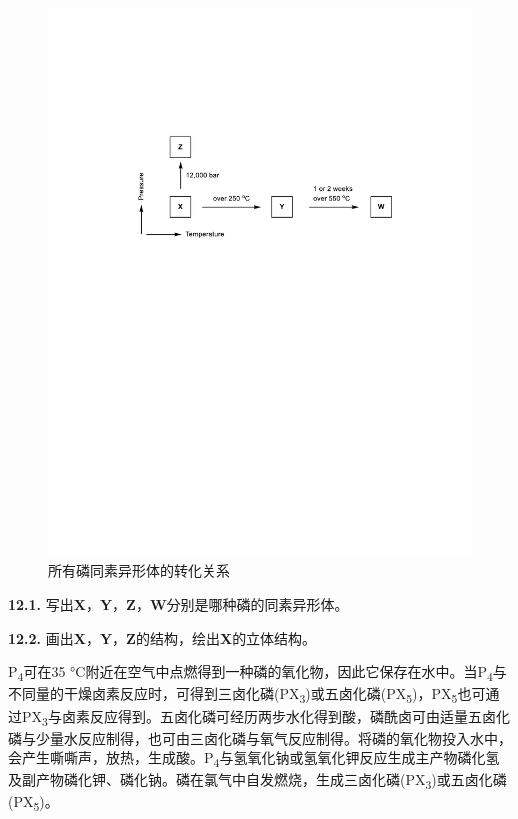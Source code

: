 \begin{figure}[H]
	\centering
	\includegraphics[width=13cm]{./pic/t12-2.pdf}
	\caption*{所有磷同素异形体的转化关系}
\end{figure}

\noindent\textbf{12.1.}
写出\textbf{X}，\textbf{Y}，\textbf{Z}，\textbf{W}分别是哪种磷的同素异形体。

\noindent\textbf{12.2.}
画出\textbf{X}，\textbf{Y}，\textbf{Z}的结构，绘出\textbf{X}的立体结构。

P\textsubscript{4}可在35 °C附近在空气中点燃得到一种磷的氧化物，因此它保存在水中。当P\textsubscript{4}与不同量的干燥卤素反应时，可得到三卤化磷(PX\textsubscript{3})或五卤化磷(PX\textsubscript{5})，PX\textsubscript{5}也可通过PX\textsubscript{3}与卤素反应得到。五卤化磷可经历两步水化得到酸，磷酰卤可由适量五卤化磷与少量水反应制得，也可由三卤化磷与氧气反应制得。将磷的氧化物投入水中，会产生嘶嘶声，放热，生成酸。P\textsubscript{4}与氢氧化钠或氢氧化钾反应生成主产物磷化氢及副产物磷化钾、磷化钠。磷在氯气中自发燃烧，生成三卤化磷(PX\textsubscript{3})或五卤化磷(PX\textsubscript{5})。

